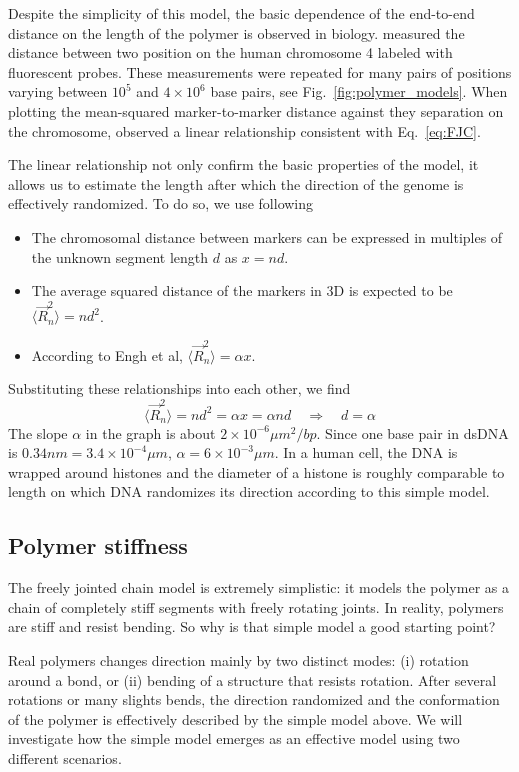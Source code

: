 Despite the simplicity of this model, the basic dependence of the end-to-end distance on the length of the polymer is observed in biology.
\citet{engh_estimating_1992} measured the distance between two position on the human chromosome 4 labeled with fluorescent probes.
These measurements were repeated for many pairs of positions varying between $10^5$ and $4\times 10^6$ base pairs, see Fig.~\ref{fig:polymer_models}.
When plotting the mean-squared marker-to-marker distance against they separation on the chromosome, \citet{engh_estimating_1992} observed a linear relationship consistent with Eq.~\ref{eq:FJC}.

The linear relationship not only confirm the basic properties of the model, it allows us to estimate the length after which the direction of the genome is effectively randomized.
To do so, we use following
\begin{itemize}
	\item The chromosomal distance between markers can be expressed in multiples of the unknown segment length $d$ as $x = nd$.
	\item The average squared distance of the markers in 3D is expected to be $\langle \vec{R}_n^2\rangle = nd^2$.
	\item According to Engh et al, $\langle \vec{R}_n^2\rangle = \alpha x$.
\end{itemize}
Substituting these relationships into each other, we find
\begin{equation}
	\langle \vec{R}_n^2\rangle = nd^2 = \alpha x = \alpha n d \quad \Rightarrow \quad d=\alpha
\end{equation}
The slope $\alpha$ in the graph is about $2\times 10^{-6}\mu m^2/bp$.
Since one base pair in dsDNA is $0.34nm = 3.4\times 10^{-4}\mu m$, $\alpha = 6\times 10^{-3} \mu m$.
In a human cell, the DNA is wrapped around histones and the diameter of a histone is roughly comparable to length on which DNA randomizes its direction according to this simple model.


\subsection*{Polymer stiffness}
The freely jointed chain model is extremely simplistic: it models the polymer as a chain of completely stiff segments with freely rotating joints.
In reality, polymers are stiff and resist bending.
So why is that simple model a good starting point?

Real polymers changes direction mainly by two distinct modes: (i) rotation around a bond, or (ii) bending of a structure that resists rotation.
After several rotations or many slights bends, the direction randomized and the conformation of the polymer is effectively described by the simple model above.
We will investigate how the simple model emerges as an effective model using two different scenarios.


